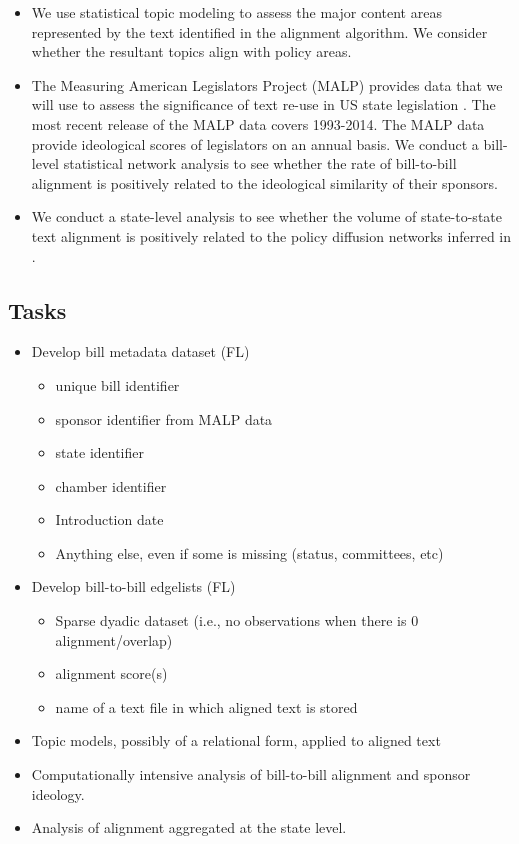 \documentclass[12pt]{article} %
\begin{document}
\begin{itemize}
\item We use statistical topic modeling to assess the major content areas represented by the text identified in the alignment algorithm. We consider whether the resultant topics align with policy areas.
\item The Measuring American Legislators Project (MALP) provides data that we will use to assess the significance of text re-use in US state legislation \citet{shor2011}. The most recent release of the MALP data covers 1993-2014. The MALP data provide ideological scores of legislators on an annual basis. We conduct a bill-level statistical network analysis to see whether the rate of bill-to-bill alignment is positively related to the ideological similarity of their sponsors.
\item We conduct a state-level analysis to see whether the volume of state-to-state text alignment is positively related to the policy diffusion networks inferred in \citet{desmarais2015}.
\end{itemize}


\subsection{Tasks}
\begin{itemize}
\item Develop bill metadata dataset (FL)
\begin{itemize}
\item unique bill identifier
\item sponsor identifier from  MALP data
\item state identifier
\item chamber identifier
\item Introduction date
\item Anything else, even if some is missing (status, committees, etc)
\end{itemize}
\item Develop bill-to-bill edgelists (FL)
\begin{itemize}
\item Sparse dyadic dataset (i.e., no observations when there is 0 alignment/overlap)
\item alignment score(s)
\item name of a text file in which aligned text is stored
\end{itemize}
\item Topic models, possibly of a relational form, applied to aligned text
\item Computationally intensive analysis of bill-to-bill alignment and sponsor ideology.
\item Analysis of alignment aggregated at the state level.

\end{itemize}




\end{document}
